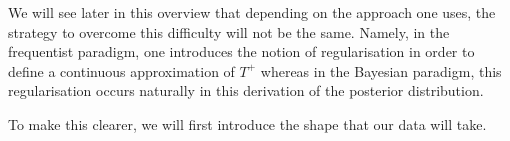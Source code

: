 \medskip

We will see later in this overview that depending on the approach one uses, the strategy to overcome this difficulty will not be the same.
Namely, in the frequentist paradigm, one introduces the notion of regularisation in order to define a continuous approximation of $T^{+}$ whereas in the Bayesian paradigm, this regularisation occurs naturally in this derivation of the posterior distribution.

To make this clearer, we will first introduce the shape that our data will take.
